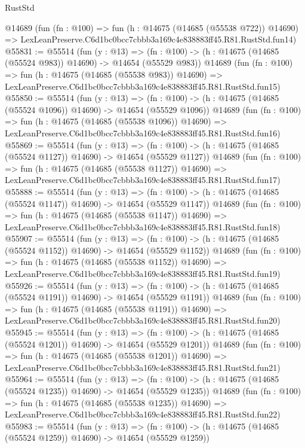 \begin{lexlean}{RustStd}
\begin{coremodule}
    @14689
    (fun (fn : @100) =>
    fun (h : @14675 (@14685 (@55538 @722)) @14690) =>
    LexLeanPreserve.C6d1bc0bcc7cbbb3a169c4e838883ff45.R81.RustStd.fun14)
@55831 := @55514
    (fun (y : @13) =>
    (fn : @100) -> (h : @14675 (@14685 (@55524 @983)) @14690) -> @14654 (@55529 @983))
    @14689
    (fun (fn : @100) =>
    fun (h : @14675 (@14685 (@55538 @983)) @14690) =>
    LexLeanPreserve.C6d1bc0bcc7cbbb3a169c4e838883ff45.R81.RustStd.fun15)
@55850 := @55514
    (fun (y : @13) =>
    (fn : @100) -> (h : @14675 (@14685 (@55524 @1096)) @14690) -> @14654 (@55529 @1096))
    @14689
    (fun (fn : @100) =>
    fun (h : @14675 (@14685 (@55538 @1096)) @14690) =>
    LexLeanPreserve.C6d1bc0bcc7cbbb3a169c4e838883ff45.R81.RustStd.fun16)
@55869 := @55514
    (fun (y : @13) =>
    (fn : @100) -> (h : @14675 (@14685 (@55524 @1127)) @14690) -> @14654 (@55529 @1127))
    @14689
    (fun (fn : @100) =>
    fun (h : @14675 (@14685 (@55538 @1127)) @14690) =>
    LexLeanPreserve.C6d1bc0bcc7cbbb3a169c4e838883ff45.R81.RustStd.fun17)
@55888 := @55514
    (fun (y : @13) =>
    (fn : @100) -> (h : @14675 (@14685 (@55524 @1147)) @14690) -> @14654 (@55529 @1147))
    @14689
    (fun (fn : @100) =>
    fun (h : @14675 (@14685 (@55538 @1147)) @14690) =>
    LexLeanPreserve.C6d1bc0bcc7cbbb3a169c4e838883ff45.R81.RustStd.fun18)
@55907 := @55514
    (fun (y : @13) =>
    (fn : @100) -> (h : @14675 (@14685 (@55524 @1152)) @14690) -> @14654 (@55529 @1152))
    @14689
    (fun (fn : @100) =>
    fun (h : @14675 (@14685 (@55538 @1152)) @14690) =>
    LexLeanPreserve.C6d1bc0bcc7cbbb3a169c4e838883ff45.R81.RustStd.fun19)
@55926 := @55514
    (fun (y : @13) =>
    (fn : @100) -> (h : @14675 (@14685 (@55524 @1191)) @14690) -> @14654 (@55529 @1191))
    @14689
    (fun (fn : @100) =>
    fun (h : @14675 (@14685 (@55538 @1191)) @14690) =>
    LexLeanPreserve.C6d1bc0bcc7cbbb3a169c4e838883ff45.R81.RustStd.fun20)
@55945 := @55514
    (fun (y : @13) =>
    (fn : @100) -> (h : @14675 (@14685 (@55524 @1201)) @14690) -> @14654 (@55529 @1201))
    @14689
    (fun (fn : @100) =>
    fun (h : @14675 (@14685 (@55538 @1201)) @14690) =>
    LexLeanPreserve.C6d1bc0bcc7cbbb3a169c4e838883ff45.R81.RustStd.fun21)
@55964 := @55514
    (fun (y : @13) =>
    (fn : @100) -> (h : @14675 (@14685 (@55524 @1235)) @14690) -> @14654 (@55529 @1235))
    @14689
    (fun (fn : @100) =>
    fun (h : @14675 (@14685 (@55538 @1235)) @14690) =>
    LexLeanPreserve.C6d1bc0bcc7cbbb3a169c4e838883ff45.R81.RustStd.fun22)
@55983 := @55514
    (fun (y : @13) =>
    (fn : @100) -> (h : @14675 (@14685 (@55524 @1259)) @14690) -> @14654 (@55529 @1259))

\end{coremodule}
\end{lexlean}
